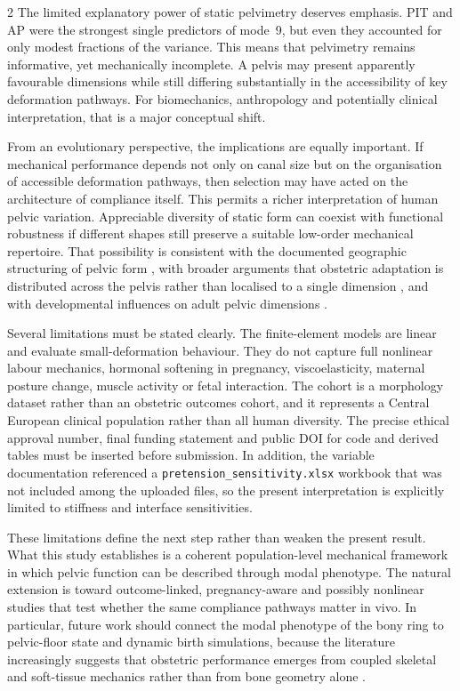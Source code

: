 \documentclass[openacc]{rsproca_new}
\begin{document}
\begin{multicols}{2}
The limited explanatory power of static pelvimetry deserves emphasis. PIT and AP were the strongest single predictors of mode~9, but even they accounted for only modest fractions of the variance. This means that pelvimetry remains informative, yet mechanically incomplete. A pelvis may present apparently favourable dimensions while still differing substantially in the accessibility of key deformation pathways. For biomechanics, anthropology and potentially clinical interpretation, that is a major conceptual shift.

From an evolutionary perspective, the implications are equally important. If mechanical performance depends not only on canal size but on the organisation of accessible deformation pathways, then selection may have acted on the architecture of compliance itself. This permits a richer interpretation of human pelvic variation. Appreciable diversity of static form can coexist with functional robustness if different shapes still preserve a suitable low-order mechanical repertoire. That possibility is consistent with the documented geographic structuring of pelvic form \cite{BettiManica2018,Auerbach2018}, with broader arguments that obstetric adaptation is distributed across the pelvis rather than localised to a single dimension \cite{KurkiDecrausaz2015}, and with developmental influences on adult pelvic dimensions \cite{VerbruggenNowlan2017,Novak2020}.

Several limitations must be stated clearly. The finite-element models are linear and evaluate small-deformation behaviour. They do not capture full nonlinear labour mechanics, hormonal softening in pregnancy, viscoelasticity, maternal posture change, muscle activity or fetal interaction. The cohort is a morphology dataset rather than an obstetric outcomes cohort, and it represents a Central European clinical population rather than all human diversity. The precise ethical approval number, final funding statement and public DOI for code and derived tables must be inserted before submission. In addition, the variable documentation referenced a \texttt{pretension\_sensitivity.xlsx} workbook that was not included among the uploaded files, so the present interpretation is explicitly limited to stiffness and interface sensitivities.

These limitations define the next step rather than weaken the present result. What this study establishes is a coherent population-level mechanical framework in which pelvic function can be described through modal phenotype. The natural extension is toward outcome-linked, pregnancy-aware and possibly nonlinear studies that test whether the same compliance pathways matter in vivo. In particular, future work should connect the modal phenotype of the bony ring to pelvic-floor state and dynamic birth simulations, because the literature increasingly suggests that obstetric performance emerges from coupled skeletal and soft-tissue mechanics rather than from bone geometry alone \cite{Pavlicev2020,Fremondiere2022}.


\end{multicols}
\end{document}
